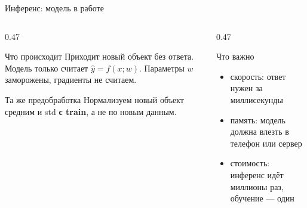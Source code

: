 \begin{frame}[c]{Инференс: модель в работе}
  \begin{columns}[T]
    \begin{column}{0.47\textwidth}
      \begin{block}{Что происходит}
        \small
        Приходит новый объект без ответа. Модель только считает $\hat y = f(x; w)$.
        Параметры $w$ заморожены, градиенты не считаем.
      \end{block}
      \begin{block}{Та же предобработка}
        \small
        Нормализуем новый объект средним и std \textbf{с train}, а не по новым данным.
      \end{block}
    \end{column}
    \begin{column}{0.47\textwidth}
      \begin{block}{Что важно}
        \small
        \begin{itemize}
          \item скорость: ответ нужен за миллисекунды
          \item память: модель должна влезть в телефон или сервер
          \item стоимость: инференс идёт миллионы раз, обучение --- один
        \end{itemize}
      \end{block}
    \end{column}
  \end{columns}
\end{frame}

